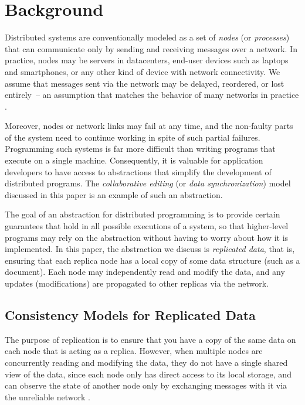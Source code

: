 \section{Background}
\label{sect.background}

Distributed systems are conventionally modeled as a set of \emph{nodes} (or \emph{processes}) that
can communicate only by sending and receiving messages over a network. In practice, nodes may be
servers in datacenters, end-user devices such as laptops and smartphones, or any other kind of
device with network connectivity. We assume that messages sent via the network may be delayed,
reordered, or lost entirely~-- an assumption that matches the behavior of many networks in practice
\cite{Bailis:2014jx}.

Moreover, nodes or network links may fail at any time, and the non-faulty parts of the system need
to continue working in spite of such partial failures. Programming such systems is far more
difficult than writing programs that execute on a single machine. Consequently, it is valuable for
application developers to have access to abstractions that simplify the development of distributed
programs. The \emph{collaborative editing} (or \emph{data synchronization}) model discussed in this
paper is an example of such an abstraction.

The goal of an abstraction for distributed programming is to provide certain guarantees that hold in
all possible executions of a system, so that higher-level programs may rely on the abstraction
without having to worry about how it is implemented. In this paper, the abstraction we discuss is
\emph{replicated data}, that is, ensuring that each replica node has a local copy of some data
structure (such as a document). Each node may independently read and modify the data, and any
updates (modifications) are propagated to other replicas via the network.

\subsection{Consistency Models for Replicated Data}\label{sect.consistencymodels}

The purpose of replication is to ensure that you have a copy of the same data on each node that is
acting as a replica. However, when multiple nodes are concurrently reading and modifying the data,
they do not have a single shared view of the data, since each node only has direct access to its
local storage, and can observe the state of another node only by exchanging messages with it via the
unreliable network \cite{Sheehy:2015jm}.

